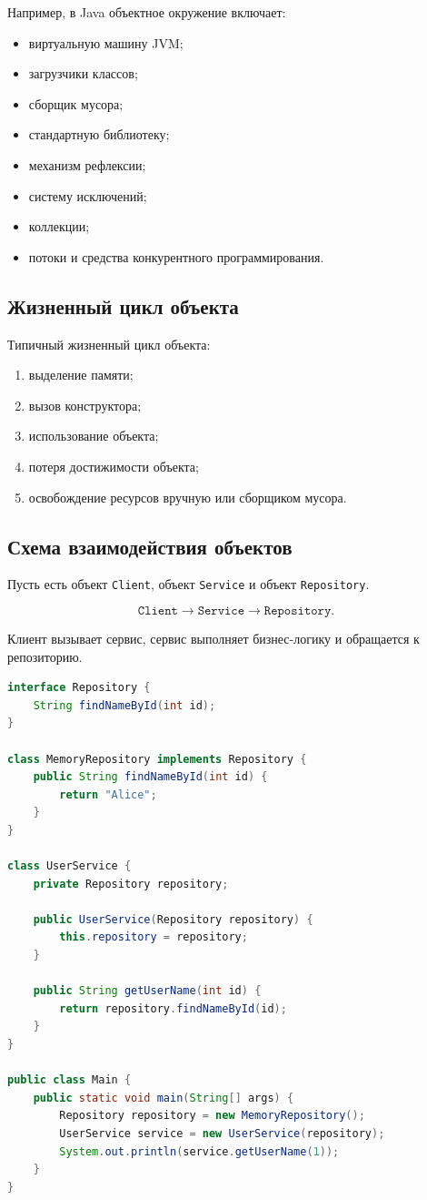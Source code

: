 \documentclass[12pt,a4paper]{article}
\begin{document}
Например, в Java объектное окружение включает:
\begin{itemize}
    \item виртуальную машину JVM;
    \item загрузчики классов;
    \item сборщик мусора;
    \item стандартную библиотеку;
    \item механизм рефлексии;
    \item систему исключений;
    \item коллекции;
    \item потоки и средства конкурентного программирования.
\end{itemize}

\subsection{Жизненный цикл объекта}

Типичный жизненный цикл объекта:
\begin{enumerate}
    \item выделение памяти;
    \item вызов конструктора;
    \item использование объекта;
    \item потеря достижимости объекта;
    \item освобождение ресурсов вручную или сборщиком мусора.
\end{enumerate}

\subsection{Схема взаимодействия объектов}

Пусть есть объект \texttt{Client}, объект \texttt{Service} и объект \texttt{Repository}.

\[
\texttt{Client} \rightarrow \texttt{Service} \rightarrow \texttt{Repository}.
\]

Клиент вызывает сервис, сервис выполняет бизнес-логику и обращается к репозиторию.

\begin{lstlisting}[language=Java,caption={Простое объектное окружение}]
interface Repository {
    String findNameById(int id);
}

class MemoryRepository implements Repository {
    public String findNameById(int id) {
        return "Alice";
    }
}

class UserService {
    private Repository repository;

    public UserService(Repository repository) {
        this.repository = repository;
    }

    public String getUserName(int id) {
        return repository.findNameById(id);
    }
}

public class Main {
    public static void main(String[] args) {
        Repository repository = new MemoryRepository();
        UserService service = new UserService(repository);
        System.out.println(service.getUserName(1));
    }
}
\end{lstlisting}
\end{document}

